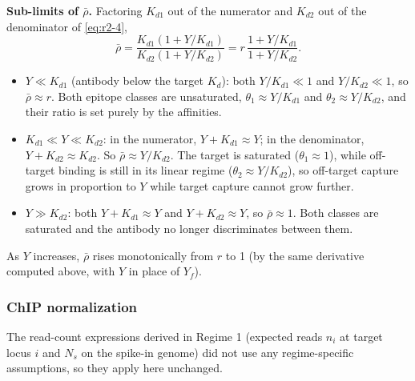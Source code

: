 \textbf{Sub-limits of $\bar\rho$.} Factoring $K_{d1}$ out of the numerator
and $K_{d2}$ out of the denominator of \eqref{eq:r2-4},
$$
\bar\rho
=\frac{K_{d1}(1+Y/K_{d1})}{K_{d2}(1+Y/K_{d2})}
=r\,\frac{1+Y/K_{d1}}{1+Y/K_{d2}}.
$$
\begin{itemize}
    \item $Y\ll K_{d1}$ (antibody below the target $K_d$): both
    $Y/K_{d1}\ll1$ and $Y/K_{d2}\ll1$, so $\bar\rho\approx r$. Both
    epitope classes are unsaturated, $\theta_1\approx Y/K_{d1}$ and
    $\theta_2\approx Y/K_{d2}$, and their ratio is set purely by the
    affinities.
    \item $K_{d1}\ll Y\ll K_{d2}$: in the numerator,
    $Y+K_{d1}\approx Y$; in the denominator, $Y+K_{d2}\approx K_{d2}$. So
    $\bar\rho\approx Y/K_{d2}$. The target is saturated
    ($\theta_1\approx1$), while off-target binding is still in its linear
    regime ($\theta_2\approx Y/K_{d2}$), so off-target capture grows in
    proportion to $Y$ while target capture cannot grow further.
    \item $Y\gg K_{d2}$: both $Y+K_{d1}\approx Y$ and $Y+K_{d2}\approx Y$,
    so $\bar\rho\approx1$. Both classes are saturated and the antibody no
    longer discriminates between them.
\end{itemize}
As $Y$ increases, $\bar\rho$ rises monotonically from $r$ to 1 (by the
same derivative computed above, with $Y$ in place of $Y_f$).

\subsubsection{ChIP normalization}

The read-count expressions derived in Regime 1 (expected reads $n_i$ at
target locus $i$ and $N_s$ on the spike-in genome) did not use any
regime-specific assumptions, so they apply here unchanged.

